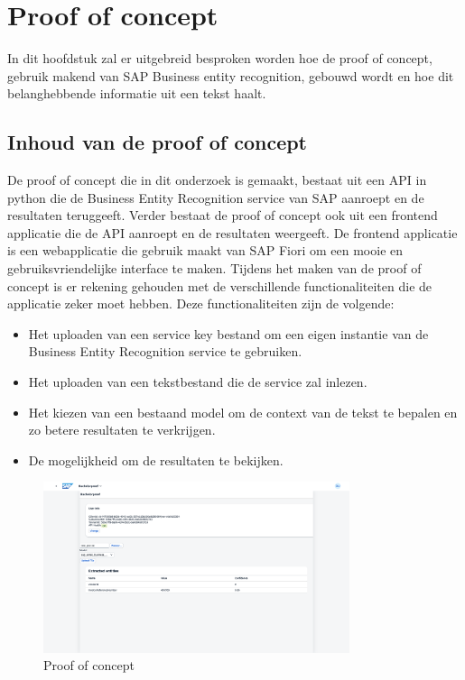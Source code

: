 
\chapter{Proof of concept}%
\label{ch:proof-of-concept}

In dit hoofdstuk zal er uitgebreid besproken worden hoe de proof of concept, gebruik makend van SAP Business entity recognition, gebouwd wordt en hoe dit belanghebbende informatie uit een tekst haalt.

\section{Inhoud van de proof of concept}
De proof of concept die in dit onderzoek is gemaakt, bestaat uit een API in python die de Business Entity Recognition service van SAP aanroept en de resultaten teruggeeft. Verder bestaat de proof of concept ook uit een frontend applicatie die de API aanroept en de resultaten weergeeft. De frontend applicatie is een webapplicatie die gebruik maakt van SAP Fiori om een mooie en gebruiksvriendelijke interface te maken.
Tijdens het maken van de proof of concept is er rekening gehouden met de verschillende functionaliteiten die de applicatie zeker moet hebben. Deze functionaliteiten zijn de volgende:
\begin{itemize}
    \item Het uploaden van een service key bestand om een eigen instantie van de Business Entity Recognition service te gebruiken.
    \item Het uploaden van een tekstbestand die de service zal inlezen.
    \item Het kiezen van een bestaand model om de context van de tekst te bepalen en zo betere resultaten te verkrijgen.
    \item De mogelijkheid om de resultaten te bekijken.
\end{itemize}

\begin{figure}[H]
    \centering
    \includegraphics[width=0.8\textwidth]{./graphics/proof-of-concept.png}
    \caption{Proof of concept}
    \label{fig:proof-of-concept}
\end{figure}

